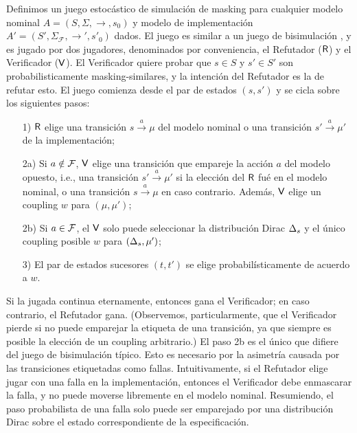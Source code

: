 Definimos un juego estocástico de simulación de masking para cualquier modelo nominal
$A = ( S, \Sigma, {\rightarrow}, s_0 )$ y modelo de implementación $A' = ( S', \Sigma_{\mathcal{F}}, {\rightarrow'}, s'_0 )$ dados. 
El juego es similar a un juego de bisimulación \cite{Stirling98}, y es jugado por dos jugadores, 
denominados por conveniencia, el Refutador ($\mathsf{R}$) y el Verificador ($\mathsf{V}$). El Verificador quiere probar que $s \in S$ y $s' \in S'$ son probabilisticamente masking-similares, 
y la intención del Refutador es la de refutar esto.
El juego comienza desde el par de estados $(s,s')$ y se cicla sobre los siguientes pasos:
\begin{enumerate}
\item[1)]
  $\mathsf{R}$ elige una transición $s \xrightarrow{a} \mu$ del modelo nominal o una transición $s' \xrightarrow{a} \mu'$ de la implementación;
\item[2a)]
  Si $a \notin \mathcal{F}$, $\mathsf{V}$ elige una transición que empareje la acción $a$ del modelo opuesto, i.e., una transición $s'
  \xrightarrow{a} \mu'$ si la elección del $\mathsf{R}$ fué en el modelo nominal,
  o una transición $s \xrightarrow{a} \mu$ en caso contrario.  Además,
  $\mathsf{V}$ elige un coupling $w$ para $(\mu, \mu')$;
\item[2b)]
  Si $a \in \mathcal{F}$, el $\mathsf{V}$ solo puede seleccionar la distribución Dirac $\Delta_{s}$ y el único coupling posible $w$ para
  $(\Delta_{s}, \mu')$;
\item[3)]
  El par de estados sucesores $(t, t')$ se elige probabilísticamente de acuerdo a $w$.
\end{enumerate}
%
Si la jugada continua eternamente, entonces gana el Verificador; en caso contrario, el Refutador gana. (Observemos, particularmente, que el Verificador pierde si no puede emparejar la etiqueta de una transición, ya que siempre es posible la elección de un coupling arbitrario.)  El paso 2b es el único que difiere del juego de bisimulación típico.  Esto es necesario por la asimetría causada por las transiciones etiquetadas como fallas. Intuitivamente,  si el Refutador elige jugar con una falla en la implementación, entonces el Verificador debe enmascarar la falla, y no puede moverse libremente en el modelo nominal.  Resumiendo, el paso probabilista de una falla solo puede ser emparejado por una distribución Dirac sobre el estado correspondiente de la especificación.

